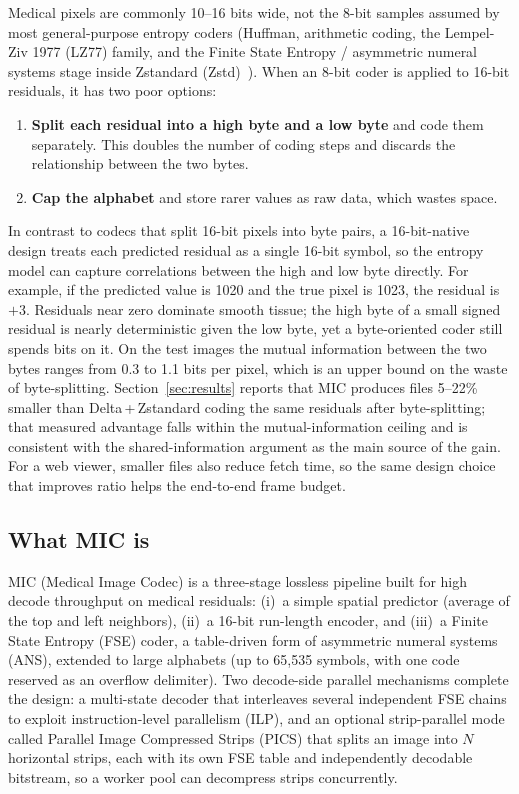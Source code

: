 \documentclass[journal]{IEEEtran}
\begin{document}
Medical pixels are commonly 10--16 bits wide, not the 8-bit samples assumed by
most general-purpose entropy coders (Huffman, arithmetic coding, the
Lempel-Ziv 1977 (LZ77) family, and the Finite State Entropy / asymmetric
numeral systems stage inside Zstandard (Zstd)~\cite{rfc8878}). When an 8-bit
coder is applied to 16-bit residuals, it has two poor options:

\begin{enumerate}
  \item \textbf{Split each residual into a high byte and a low byte} and code
  them separately. This doubles the number of coding steps and discards the
  relationship between the two bytes.
  \item \textbf{Cap the alphabet} and store rarer values as raw data, which
  wastes space.
\end{enumerate}

In contrast to codecs that split 16-bit pixels into byte pairs, a 16-bit-native
design treats each predicted residual as a single 16-bit symbol, so the entropy
model can capture correlations between the high and low byte directly. For
example, if the predicted value is 1020 and the true pixel is 1023, the
residual is $+3$. Residuals near zero dominate smooth tissue; the high byte of
a small signed residual is nearly deterministic given the low byte, yet a
byte-oriented coder still spends bits on it. On the test images the mutual
information between the two bytes ranges from 0.3 to 1.1 bits per pixel, which
is an upper bound on the waste of byte-splitting.
Section~\ref{sec:results} reports that MIC produces files 5--22\% smaller than
Delta\,+\,Zstandard coding the same residuals after byte-splitting; that
measured advantage falls within the mutual-information ceiling and is
consistent with the shared-information argument as the main source of the
gain. For a web viewer, smaller files also reduce fetch time, so the same
design choice that improves ratio helps the end-to-end frame budget.

\subsection{What MIC is}

MIC (Medical Image Codec) is a three-stage lossless pipeline built for high
decode throughput on medical residuals: (i)~a simple spatial predictor
(average of the top and left neighbors), (ii)~a 16-bit run-length encoder, and
(iii)~a Finite State Entropy (FSE) coder, a table-driven form of asymmetric
numeral systems (ANS), extended to large alphabets (up to 65,535 symbols, with
one code reserved as an overflow delimiter). Two decode-side parallel
mechanisms complete the design: a multi-state decoder that interleaves several
independent FSE chains to exploit instruction-level parallelism (ILP), and an
optional strip-parallel mode called Parallel Image Compressed Strips (PICS)
that splits an image into $N$ horizontal strips, each with its own FSE table
and independently decodable bitstream, so a worker pool can decompress strips
concurrently.
\end{document}
